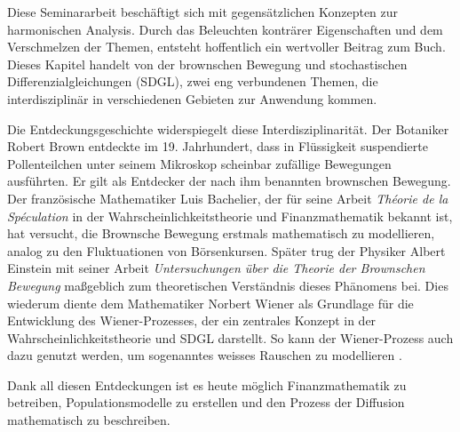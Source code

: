 %
%
%
%

Diese Seminararbeit beschäftigt sich mit gegensätzlichen Konzepten zur harmonischen Analysis. Durch das Beleuchten konträrer Eigenschaften und dem Verschmelzen der Themen, entsteht hoffentlich ein wertvoller Beitrag zum Buch. Dieses Kapitel handelt von der brownschen Bewegung und stochastischen Differenzialgleichungen (SDGL), zwei eng verbundenen Themen, die interdisziplinär in verschiedenen Gebieten zur Anwendung kommen.

Die Entdeckungsgeschichte widerspiegelt diese Interdisziplinarität. Der Botaniker Robert Brown entdeckte im 19. Jahrhundert, dass in Flüssigkeit suspendierte Pollenteilchen unter seinem Mikroskop scheinbar zufällige Bewegungen ausführten. Er gilt als Entdecker der nach ihm benannten brownschen Bewegung. Der französische Mathematiker Luis Bachelier, der für seine Arbeit \textit{Théorie de la Spéculation} \cite{bachelier1900théorie} in der Wahrscheinlichkeitstheorie und Finanzmathematik bekannt ist, hat versucht, die Brownsche Bewegung erstmals mathematisch zu modellieren, analog zu den Fluktuationen von Börsenkursen. Später trug der Physiker Albert Einstein mit seiner Arbeit \textit{Untersuchungen über die Theorie der Brownschen Bewegung} \cite{einstein1922untersuchungen} maßgeblich zum theoretischen Verständnis dieses Phänomens bei. Dies wiederum diente dem Mathematiker Norbert Wiener als Grundlage für die Entwicklung des Wiener-Prozesses, der ein zentrales Konzept in der Wahrscheinlichkeitstheorie und SDGL darstellt. So kann der Wiener-Prozess auch dazu genutzt werden, um sogenanntes weisses Rauschen zu modellieren .

Dank all diesen Entdeckungen ist es heute möglich Finanzmathematik zu betreiben, Populationsmodelle zu erstellen und den Prozess der Diffusion mathematisch zu beschreiben. %
